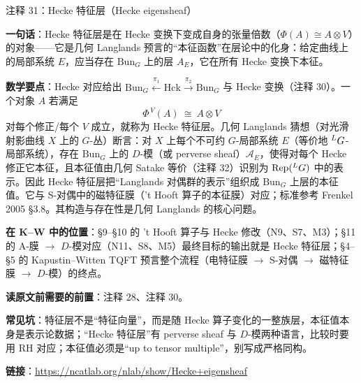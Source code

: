 \begin{kcard}{注释 31：Hecke 特征层（Hecke eigensheaf）}

\textbf{一句话}：Hecke 特征层是在 Hecke 变换下变成自身的张量倍数（$\Phi(A)\cong A\otimes V$）的对象——它是几何 Langlands 预言的“本征函数”在层论中的化身：给定曲线上的局部系统 $E$，应当存在 $\mathrm{Bun}_G$ 上的层 $A_E$，它在所有 Hecke 变换下本征。

\textbf{数学要点}：Hecke 对应给出 $\mathrm{Bun}_G\xleftarrow{\pi_1}\mathrm{Hck}\xrightarrow{\pi_2}\mathrm{Bun}_G$ 与 Hecke 变换（注释 30）。一个对象 $A$ 若满足
\[
\Phi^{\,V}(A)\ \cong\ A\otimes V
\]
对每个修正/每个 $V$ 成立，就称为 Hecke 特征层。几何 Langlands 猜想（对光滑射影曲线 $X$ 上的 $G$-丛）断言：对 $X$ 上每个不可约 $G$-局部系统 $E$（等价地 ${}^{L}G$-局部系统），存在 $\mathrm{Bun}_G$ 上的 $D$-模（或 perverse sheaf）$\mathcal A_E$，使得对每个 Hecke 修正它本征，且本征值由几何 Satake 等价（注释 32）识别为 $\mathrm{Rep}({}^{L}G)$ 中的表示。因此 Hecke 特征层把“Langlands 对偶群的表示”组织成 $\mathrm{Bun}_G$ 上层的本征值。它与 S-对偶中的磁特征膜（'t Hooft 算子的本征膜）对应；标准参考 Frenkel 2005 §3.8。其构造与存在性是几何 Langlands 的核心问题。

\textbf{在 K--W 中的位置}：§9--§10 的 't Hooft 算子与 Hecke 修改（N9、S7、M3）；§11 的 A-膜 $\to$ $D$-模对应（N11、S8、M5）最终目标的输出就是 Hecke 特征层；§4--§5 的 Kapustin--Witten TQFT 预言整个流程（电特征膜 $\to$ S-对偶 $\to$ 磁特征膜 $\to$ $D$-模）的终点。

\textbf{读原文前需要的前置}：注释 28、注释 30。

\textbf{常见坑}：特征层不是“特征向量”，而是随 Hecke 算子变化的一整族层，本征值本身是表示论数据；“Hecke 特征层”有 perverse sheaf 与 $D$-模两种语言，比较时要用 RH 对应；本征值必须是“up to tensor multiple”，别写成严格同构。

\noindent\textbf{链接}：\url{https://ncatlab.org/nlab/show/Hecke+eigensheaf}
\end{kcard}

